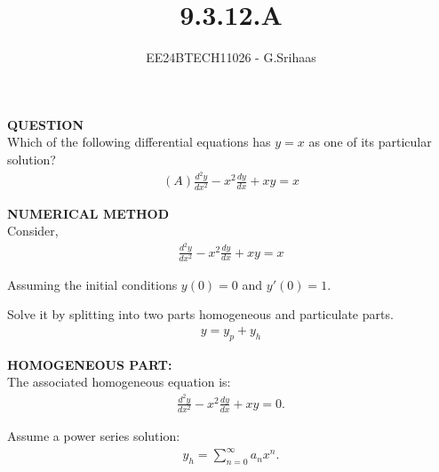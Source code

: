 \documentclass[journal]{IEEEtran}
\begin{document}

\vspace{3cm}

\title{9.3.12.A}
\author{EE24BTECH11026 - G.Srihaas}
{\let\newpage\relax\maketitle}

\renewcommand{\thefigure}{\theenumi}
\renewcommand{\thetable}{\theenumi}
\setlength{\intextsep}{10pt} %


\renewcommand{\thetable}{\theenumi}

\textbf{QUESTION} \\
Which of the following differential equations has $y = x$ as one of its particular
solution?\\
\begin{align}
(A) \frac{d^2y}{dx^2} - x^2\frac{dy}{dx} + xy = x
\end{align}

\solution
\textbf{NUMERICAL METHOD}\\
	
Consider,
\begin{align}
\frac{d^2y}{dx^2} - x^2\frac{dy}{dx} + xy = x
\end{align}

Assuming the initial conditions $y(0) = 0$ and $y'(0) = 1.$

Solve it by splitting into two parts homogeneous and particulate parts.
\begin{align}
y=y_p+y_h
\end{align}

\textbf{HOMOGENEOUS PART:}\\

The associated homogeneous equation is:
\begin{align}
\frac{d^2y}{dx^2} - x^2\frac{dy}{dx} + xy = 0.
\end{align}

Assume a power series solution:
\begin{align}
y_h = \sum_{n=0}^\infty a_n x^n.
\end{align}
\end{document}
